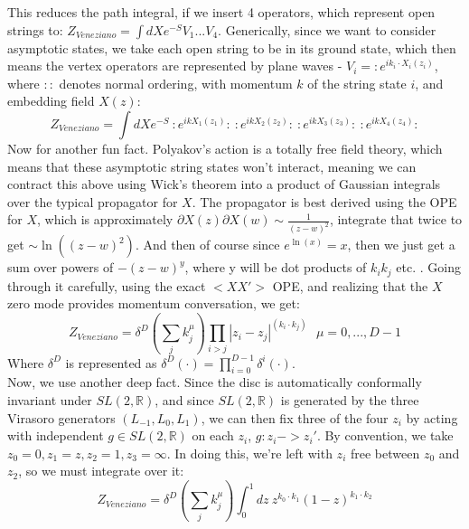 \documentclass{article}
\begin{document}
This reduces the path integral, if we insert 4 operators, which represent open strings to:
$Z_{Veneziano}=\int dX e^{-S}V_1...V_4$. Generically, since we want to consider asymptotic states, we take each open string to be in its ground state, which then means the vertex operators are represented by plane waves - $V_i=:e^{ik_i \cdot X_i(z_i)}$, where $: :$ denotes normal ordering, with momentum $k$ of the string state $i$, and embedding field $X(z)$:
\begin{equation}
    Z_{Veneziano}=\int dX e^{-S}\::e^{ikX_1(z_1)}:\: :e^{ikX_2(z_2)}:\::e^{ikX_3(z_3)}:\::e^{ikX_4(z_4)}:
\end{equation}
Now for another fun fact. Polyakov's action is a totally free field theory, which means that these asymptotic string states won't interact, meaning we can contract this above using Wick's theorem into a product of Gaussian integrals over the typical propagator for $X$. The propagator is best derived using the OPE for $X$, which is approximately $\partial X(z) \partial X(w) \sim \frac{1}{(z-w)^2}$, integrate that twice to get $\sim \ln((z-w)^2)$. And then of course since $e^{\ln(x)}=x$, then we just get a sum over powers of $-(z-w)^y$, where y will be dot products of $k_i k_j$ etc. . Going through it carefully, using the exact $<XX'>$ OPE, and realizing that the $X$ zero mode provides momentum conversation, we get:
\begin{equation}
Z_{Veneziano}=\delta^D(\sum_j k_j^\mu)\prod_{i>j}|z_i-z_j|^{(k_i \cdot k_j)}\:\:\: \mu=0,...,D-1
\end{equation}
Where $\delta^D$ is represented as $\delta^D(\cdot)=\prod_{i=0}^{D-1}\delta^i(\cdot)$. \\
Now, we use another deep fact. Since the disc is automatically conformally invariant under $SL(2,\mathbb{R})$, and since $SL(2,\mathbb{R})$ is generated by the three Virasoro generators $(L_{-1},L_0,L_1)$, we can then fix three of the four $z_i$ by acting with independent $g\in SL(2,\mathbb{R})$ on each $z_i$, $g:z_i -> z_i'$. By convention, we take $z_0=0, z_1=z,z_2=1,z_3=\infty$. In doing this, we're left with $z_i$ free between $z_0$ and $z_2$, so we must integrate over it:
\begin{equation}
Z_{Veneziano}=\delta^D(\sum_j k_j^\mu)\int_0^1dz\:z^{k_0\cdot k_1}(1-z)^{k_1 \cdot k_2}
\end{equation}
\end{document}
